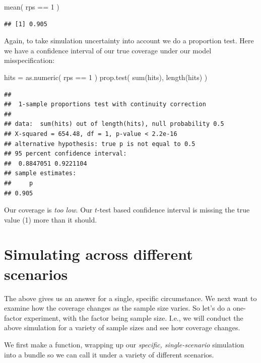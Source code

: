 \documentclass[
]{book}
\newenvironment{Shaded}{\begin{snugshade}}{\end{snugshade}}
\newcommand{\DecValTok}[1]{\textcolor[rgb]{0.00,0.00,0.81}{#1}}
\newcommand{\FunctionTok}[1]{\textcolor[rgb]{0.00,0.00,0.00}{#1}}
\newcommand{\NormalTok}[1]{#1}
\newcommand{\OtherTok}[1]{\textcolor[rgb]{0.56,0.35,0.01}{#1}}
\newcommand{\SpecialCharTok}[1]{\textcolor[rgb]{0.00,0.00,0.00}{#1}}
\begin{document}
\begin{Shaded}
\begin{Highlighting}[]
\FunctionTok{mean}\NormalTok{( rps }\SpecialCharTok{==} \DecValTok{1}\NormalTok{ )}
\end{Highlighting}
\end{Shaded}

\begin{verbatim}
## [1] 0.905
\end{verbatim}

Again, to take simulation uncertainty into account we do a proportion test.
Here we have a confidence interval of our true coverage under our model
misspecification:

\begin{Shaded}
\begin{Highlighting}[]
\NormalTok{hits }\OtherTok{=} \FunctionTok{as.numeric}\NormalTok{( rps }\SpecialCharTok{==} \DecValTok{1}\NormalTok{ )}
\FunctionTok{prop.test}\NormalTok{( }\FunctionTok{sum}\NormalTok{(hits), }\FunctionTok{length}\NormalTok{(hits) )}
\end{Highlighting}
\end{Shaded}

\begin{verbatim}
## 
##  1-sample proportions test with continuity correction
## 
## data:  sum(hits) out of length(hits), null probability 0.5
## X-squared = 654.48, df = 1, p-value < 2.2e-16
## alternative hypothesis: true p is not equal to 0.5
## 95 percent confidence interval:
##  0.8847051 0.9221104
## sample estimates:
##     p 
## 0.905
\end{verbatim}

Our coverage is \emph{too low}. Our \(t\)-test based confidence interval is missing
the true value (1) more than it should.

\hypertarget{simulating-across-different-scenarios}{%
\section{Simulating across different scenarios}\label{simulating-across-different-scenarios}}

The above gives us an answer for a single, specific circumstance. We next
want to examine how the coverage changes as the sample size varies. So let's
do a one-factor experiment, with the factor being sample size. I.e., we will
conduct the above simulation for a variety of sample sizes and see how
coverage changes.

We first make a function, wrapping up our \emph{specific, single-scenario}
simulation into a bundle so we can call it under a variety of different
scenarios.
\end{document}
